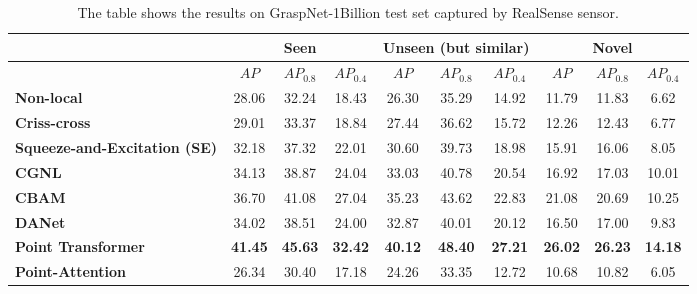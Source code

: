 \begin{table}[h]
\caption{The table shows the results on GraspNet-1Billion test set captured by RealSense sensor.}
\label{tab:grasp_detect_eval_RealSense}
\begin{center}
\begin{tabular}{|l|c|c|c|c|c|c|c|c|c|}
\hline
& \multicolumn{3}{c|}{Seen} & \multicolumn{3}{c|}{Unseen (but similar)} & \multicolumn{3}{c|}{Novel} \\
\hline
& $AP$ & $AP_{0.8}$ & $AP_{0.4}$ & $AP$ & $AP_{0.8}$ & $AP_{0.4}$ & $AP$ & $AP_{0.8}$ & $AP_{0.4}$  \\
\hline
\textbf{Non-local} & 28.06 & 32.24 & 18.43 & 26.30 & 35.29 & 14.92 & 11.79 & 11.83 & 6.62 \\
\hline
\textbf{Criss-cross} & 29.01 & 33.37 & 18.84 & 27.44 & 36.62 & 15.72 & 12.26 & 12.43 & 6.77 \\
\hline
\textbf{Squeeze-and-Excitation (SE)} & 32.18 & 37.32 & 22.01 & 30.60 & 39.73 & 18.98 & 15.91 & 16.06 & 8.05 \\
\hline
\textbf{CGNL} & 34.13 & 38.87 & 24.04 & 33.03 & 40.78 & 20.54 & 16.92 & 17.03 & 10.01 \\
\hline
\textbf{CBAM} & 36.70 & 41.08 & 27.04 & 35.23 & 43.62 & 22.83 & 21.08 & 20.69 & 10.25 \\
\hline
\textbf{DANet} & 34.02 & 38.51 & 24.00 & 32.87 & 40.01 & 20.12 & 16.50 & 17.00 & 9.83 \\
\hline
\textbf{Point Transformer} & \textbf{41.45} & \textbf{45.63} & \textbf{32.42} & \textbf{40.12} & \textbf{48.40} & \textbf{27.21} & \textbf{26.02} & \textbf{26.23} & \textbf{14.18} \\
\hline
\textbf{Point-Attention} & 26.34 & 30.40 & 17.18 & 24.26 & 33.35 & 12.72 & 10.68 & 10.82 & 6.05 \\
\hline

\end{tabular}
\end{center}
\end{table}


